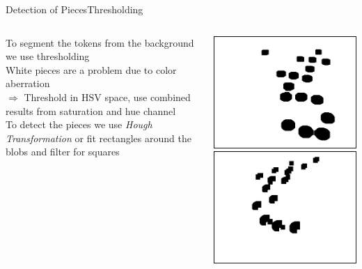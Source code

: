 \documentclass[table]{beamer}
\begin{document}
\begin{frame}{Detection of Pieces}{Thresholding}
	\begin{columns}
		\begin{column}{0.6\textwidth}
			To segment the tokens from the background we use thresholding\\[0.5cm]

			White pieces are a problem due to color aberration\\
			$\Rightarrow$ Threshold in HSV space, use combined results from saturation and hue channel\\[0.5cm]

			To detect the pieces we use \emph{Hough Transformation} or fit rectangles around the blobs and filter for squares
		\end{column}
		\begin{column}{0.3\textwidth}
			\includegraphics[width=\columnwidth]{images/pieces_thresh_s.png}\\
			\includegraphics[width=\columnwidth]{images/pieces_thresh_v.png}
		\end{column}
	\end{columns}
\end{frame}
\end{document}
